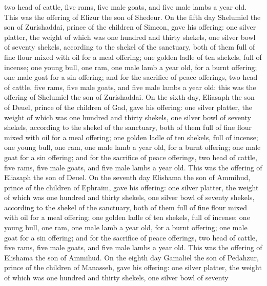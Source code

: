 two head of cattle, five rams, five male goats, and five male lambs a
year old. This was the offering of Elizur the son of Shedeur.
 On the fifth day Shelumiel the son of Zurishaddai,
prince of the children of Simeon,  gave his offering: one
silver platter, the weight of which was one hundred and thirty shekels,
one silver bowl of seventy shekels, according to the shekel of the
sanctuary, both of them full of fine flour mixed with oil for a meal
offering;  one golden ladle of ten shekels, full of
incense;  one young bull, one ram, one male lamb a year
old, for a burnt offering;  one male goat for a sin
offering;  and for the sacrifice of peace offerings, two
head of cattle, five rams, five male goats, and five male lambs a year
old: this was the offering of Shelumiel the son of Zurishaddai.
 On the sixth day, Eliasaph the son of Deuel, prince of
the children of Gad,  gave his offering: one silver
platter, the weight of which was one hundred and thirty shekels, one
silver bowl of seventy shekels, according to the shekel of the
sanctuary, both of them full of fine flour mixed with oil for a meal
offering;  one golden ladle of ten shekels, full of
incense;  one young bull, one ram, one male lamb a year
old, for a burnt offering;  one male goat for a sin
offering;  and for the sacrifice of peace offerings, two
head of cattle, five rams, five male goats, and five male lambs a year
old. This was the offering of Eliasaph the son of Deuel. 
On the seventh day Elishama the son of Ammihud, prince of the children
of Ephraim,  gave his offering: one silver platter, the
weight of which was one hundred and thirty shekels, one silver bowl of
seventy shekels, according to the shekel of the sanctuary, both of them
full of fine flour mixed with oil for a meal offering; 
one golden ladle of ten shekels, full of incense;  one
young bull, one ram, one male lamb a year old, for a burnt offering;
 one male goat for a sin offering;  and
for the sacrifice of peace offerings, two head of cattle, five rams,
five male goats, and five male lambs a year old. This was the offering
of Elishama the son of Ammihud.  On the eighth day
Gamaliel the son of Pedahzur, prince of the children of Manasseh,
 gave his offering: one silver platter, the weight of
which was one hundred and thirty shekels, one silver bowl of seventy
